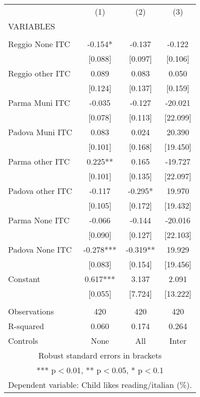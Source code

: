 \begin{tabular}{lccc} \hline
 & (1) & (2) & (3) \\
VARIABLES &  &  &  \\ \hline
 &  &  &  \\
Reggio None ITC & -0.154* & -0.137 & -0.122 \\
 & [0.088] & [0.097] & [0.106] \\
Reggio other ITC & 0.089 & 0.083 & 0.050 \\
 & [0.124] & [0.137] & [0.159] \\
Parma Muni ITC & -0.035 & -0.127 & -20.021 \\
 & [0.078] & [0.113] & [22.099] \\
Padova Muni ITC & 0.083 & 0.024 & 20.390 \\
 & [0.101] & [0.168] & [19.450] \\
Parma other ITC & 0.225** & 0.165 & -19.727 \\
 & [0.101] & [0.135] & [22.097] \\
Padova other ITC & -0.117 & -0.295* & 19.970 \\
 & [0.105] & [0.172] & [19.432] \\
Parma None ITC & -0.066 & -0.144 & -20.016 \\
 & [0.090] & [0.127] & [22.103] \\
Padova None ITC & -0.278*** & -0.319** & 19.929 \\
 & [0.083] & [0.154] & [19.456] \\
Constant & 0.617*** & 3.137 & 2.091 \\
 & [0.055] & [7.724] & [13.222] \\
 &  &  &  \\
Observations & 420 & 420 & 420 \\
R-squared & 0.060 & 0.174 & 0.264 \\
 Controls & None & All & Inter \\ \hline
\multicolumn{4}{c}{ Robust standard errors in brackets} \\
\multicolumn{4}{c}{ *** p$<$0.01, ** p$<$0.05, * p$<$0.1} \\
\multicolumn{4}{c}{ Dependent variable: Child likes reading/italian (\%).} \\
\end{tabular}
